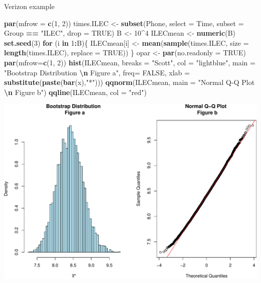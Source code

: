 \documentclass[
  ignorenonframetext,
]{beamer}
\newenvironment{Shaded}{\begin{snugshade}}{\end{snugshade}}
\newcommand{\AttributeTok}[1]{\textcolor[rgb]{0.13,0.29,0.53}{#1}}
\newcommand{\ConstantTok}[1]{\textcolor[rgb]{0.56,0.35,0.01}{#1}}
\newcommand{\ControlFlowTok}[1]{\textcolor[rgb]{0.13,0.29,0.53}{\textbf{#1}}}
\newcommand{\DecValTok}[1]{\textcolor[rgb]{0.00,0.00,0.81}{#1}}
\newcommand{\FunctionTok}[1]{\textcolor[rgb]{0.13,0.29,0.53}{\textbf{#1}}}
\newcommand{\NormalTok}[1]{#1}
\newcommand{\OtherTok}[1]{\textcolor[rgb]{0.56,0.35,0.01}{#1}}
\newcommand{\SpecialCharTok}[1]{\textcolor[rgb]{0.81,0.36,0.00}{\textbf{#1}}}
\newcommand{\StringTok}[1]{\textcolor[rgb]{0.31,0.60,0.02}{#1}}
\begin{document}
\begin{frame}[fragile]{Verizon example}
\protect\hypertarget{verizon-example-2}{}
\tiny

\begin{Shaded}
\begin{Highlighting}[]
\FunctionTok{par}\NormalTok{(}\AttributeTok{mfrow =} \FunctionTok{c}\NormalTok{(}\DecValTok{1}\NormalTok{, }\DecValTok{2}\NormalTok{))}
\NormalTok{times.ILEC }\OtherTok{\textless{}{-}} \FunctionTok{subset}\NormalTok{(Phone, }\AttributeTok{select =}\NormalTok{ Time, }\AttributeTok{subset =}\NormalTok{ Group }\SpecialCharTok{==} \StringTok{"ILEC"}\NormalTok{, }\AttributeTok{drop =} \ConstantTok{TRUE}\NormalTok{)}
\NormalTok{B }\OtherTok{\textless{}{-}} \DecValTok{10}\SpecialCharTok{\^{}}\DecValTok{4}
\NormalTok{ILECmean }\OtherTok{\textless{}{-}} \FunctionTok{numeric}\NormalTok{(B)}
\FunctionTok{set.seed}\NormalTok{(}\DecValTok{3}\NormalTok{)}
\ControlFlowTok{for}\NormalTok{ (i }\ControlFlowTok{in} \DecValTok{1}\SpecialCharTok{:}\NormalTok{B)\{}
\NormalTok{ ILECmean[i] }\OtherTok{\textless{}{-}} \FunctionTok{mean}\NormalTok{(}\FunctionTok{sample}\NormalTok{(times.ILEC, }\AttributeTok{size =} \FunctionTok{length}\NormalTok{(times.ILEC), }\AttributeTok{replace =} \ConstantTok{TRUE}\NormalTok{)) }
\NormalTok{\}}
\NormalTok{opar }\OtherTok{\textless{}{-}} \FunctionTok{par}\NormalTok{(}\AttributeTok{no.readonly =} \ConstantTok{TRUE}\NormalTok{)}
\FunctionTok{par}\NormalTok{(}\AttributeTok{mfrow=}\FunctionTok{c}\NormalTok{(}\DecValTok{1}\NormalTok{, }\DecValTok{2}\NormalTok{))}
\FunctionTok{hist}\NormalTok{(ILECmean, }\AttributeTok{breaks =} \StringTok{"Scott"}\NormalTok{, }\AttributeTok{col =} \StringTok{"lightblue"}\NormalTok{, }
     \AttributeTok{main =} \StringTok{"Bootstrap Distribution }\SpecialCharTok{\textbackslash{}n}\StringTok{ Figure a"}\NormalTok{, }
     \AttributeTok{freq=} \ConstantTok{FALSE}\NormalTok{, }\AttributeTok{xlab =} \FunctionTok{substitute}\NormalTok{(}\FunctionTok{paste}\NormalTok{(}\FunctionTok{bar}\NormalTok{(x),}\StringTok{"*"}\NormalTok{)))}
\FunctionTok{qqnorm}\NormalTok{(ILECmean, }\AttributeTok{main =} \StringTok{"Normal Q{-}Q Plot }\SpecialCharTok{\textbackslash{}n}\StringTok{ Figure b"}\NormalTok{)}
\FunctionTok{qqline}\NormalTok{(ILECmean, }\AttributeTok{col =} \StringTok{"red"}\NormalTok{)}
\end{Highlighting}
\end{Shaded}

\begin{center}\includegraphics[width=0.6\linewidth,height=0.4\textheight]{Week10_Lect_files/figure-beamer/unnamed-chunk-35-1} \end{center}
\normalsize
\end{frame}
\end{document}
